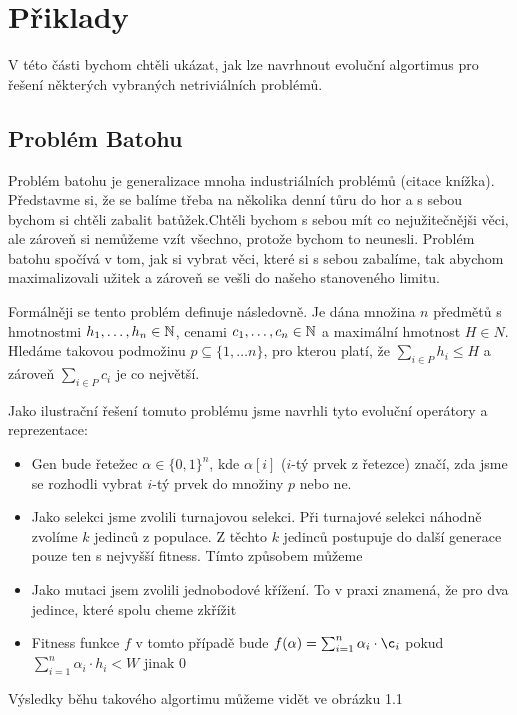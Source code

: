 \section{Přiklady}

V této části bychom chtěli ukázat, jak lze navrhnout evoluční algortimus pro řešení některých vybraných netriviálních problémů.

\subsection{Problém Batohu}

Problém batohu je generalizace mnoha industriálních problémů (citace knížka). Představme si, že se balíme třeba na několika denní tůru do hor a s sebou bychom si chtěli zabalit batůžek.Chtěli bychom s sebou mít co nejužitečnějši věci, ale zároveň si nemůžeme vzít všechno, protože bychom to neunesli. Problém batohu spočívá v tom, jak si vybrat věci, které si s sebou zabalíme, tak abychom maximalizovali užitek a zároveň se vešli do našeho stanoveného limitu.

Formálněji se tento problém definuje následovně. Je dána množina $n$ předmětů s hmotnostmi $h_1, \dots, h_n \in \mathbb{N}$, cenami $c_1, \dots, c_n \in \mathbb{N}$ a maximální hmotnost $H \in N$. Hledáme takovou podmožinu $p \subseteq \{1, \dots n\}$, pro kterou platí, že $\sum_{i \in P} h_i \leq H$ a zároveň $\sum_{i \in P} c_i$ je co největší.

Jako ilustrační řešení tomuto problému jsme navrhli tyto evoluční operátory a reprezentace:
\begin{itemize}
    \item Gen bude řetežec $\alpha \in \{0,1\}^n$, kde $\alpha[i]$ ($i$-tý prvek z řetezce) značí, zda jsme se rozhodli vybrat $i$-tý prvek do množiny $p$ nebo ne.
    \item Jako selekci jsme zvolili turnajovou selekci. Při turnajové selekci náhodně zvolíme $k$ jedinců z populace. Z těchto $k$ jedinců postupuje do další generace pouze ten s nejvyšší fitness. Tímto způsobem můžeme
    \item Jako mutaci jsem zvolili jednobodové křížení. To v praxi znamená, že pro dva jedince, které spolu cheme zkřížit
    \item Fitness funkce $f$ v tomto případě bude $f(\alpha) = \sum_{i=1}^n \alpha_i \cdot \c_i$ pokud $\sum_{i=1}^n \alpha_i \cdot h_i < W$ jinak $0$
\end{itemize}

Výsledky běhu takového algortimu můžeme vidět ve obrázku 1.1
